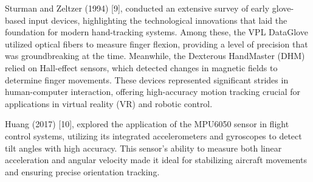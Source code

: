 Sturman and Zeltzer (1994) [9],  conducted an extensive survey of early glove-based input devices, highlighting the technological innovations that laid the foundation for modern hand-tracking systems. Among these, the VPL DataGlove utilized optical fibers to measure finger flexion, providing a level of precision that was groundbreaking at the time. Meanwhile, the Dexterous HandMaster (DHM) relied on Hall-effect sensors, which detected changes in magnetic fields to determine finger movements. These devices represented significant strides in human-computer interaction, offering high-accuracy motion tracking crucial for applications in virtual reality (VR) and robotic control.

Huang (2017) [10], explored the application of the MPU6050 sensor in flight control systems, utilizing its integrated accelerometers and gyroscopes to detect tilt angles with high accuracy. This sensor's ability to measure both linear acceleration and angular velocity made it ideal for stabilizing aircraft movements and ensuring precise orientation tracking.
